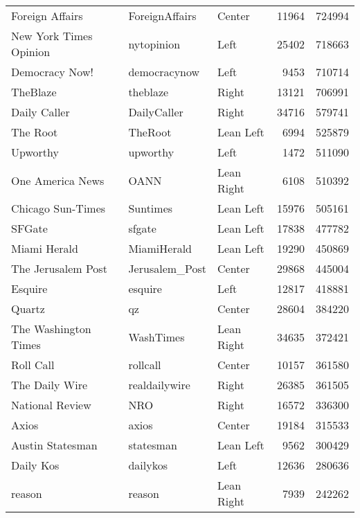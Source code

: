 \begin{tabular}{lllrr}
        Foreign Affairs &  ForeignAffairs &        Center &             11964 &     724994 \\
 New York Times Opinion &      nytopinion &          Left &             25402 &     718663 \\
         Democracy Now! &    democracynow &          Left &              9453 &     710714 \\
               TheBlaze &        theblaze &         Right &             13121 &     706991 \\
           Daily Caller &     DailyCaller &         Right &             34716 &     579741 \\
               The Root &         TheRoot &     Lean Left &              6994 &     525879 \\
               Upworthy &        upworthy &          Left &              1472 &     511090 \\
       One America News &            OANN &    Lean Right &              6108 &     510392 \\
      Chicago Sun-Times &        Suntimes &     Lean Left &             15976 &     505161 \\
                 SFGate &          sfgate &     Lean Left &             17838 &     477782 \\
           Miami Herald &     MiamiHerald &     Lean Left &             19290 &     450869 \\
     The Jerusalem Post &  Jerusalem\_Post &        Center &             29868 &     445004 \\
                Esquire &         esquire &          Left &             12817 &     418881 \\
                 Quartz &              qz &        Center &             28604 &     384220 \\
   The Washington Times &       WashTimes &    Lean Right &             34635 &     372421 \\
              Roll Call &        rollcall &        Center &             10157 &     361580 \\
         The Daily Wire &   realdailywire &         Right &             26385 &     361505 \\
        National Review &             NRO &         Right &             16572 &     336300 \\
                  Axios &           axios &        Center &             19184 &     315533 \\
       Austin Statesman &       statesman &     Lean Left &              9562 &     300429 \\
              Daily Kos &        dailykos &          Left &             12636 &     280636 \\
                 reason &          reason &    Lean Right &              7939 &     242262 \\
\bottomrule
\end{tabular}
